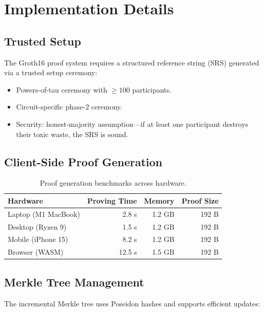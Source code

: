 \section{Implementation Details}
\label{sec:implementation}

\subsection{Trusted Setup}

The Groth16 proof system requires a structured reference string (SRS) generated via a trusted setup ceremony:

\begin{itemize}
    \item Powers-of-tau ceremony with $\geq 100$ participants.
    \item Circuit-specific phase-2 ceremony.
    \item Security: honest-majority assumption---if at least one participant destroys their toxic waste, the SRS is sound.
\end{itemize}

\subsection{Client-Side Proof Generation}

\begin{table}[H]
\centering
\caption{Proof generation benchmarks across hardware.}
\label{tab:proving}
\begin{tabular}{lrrr}
\toprule
\textbf{Hardware} & \textbf{Proving Time} & \textbf{Memory} & \textbf{Proof Size} \\
\midrule
Laptop (M1 MacBook) & 2.8 s & 1.2 GB & 192 B \\
Desktop (Ryzen 9) & 1.5 s & 1.2 GB & 192 B \\
Mobile (iPhone 15) & 8.2 s & 1.2 GB & 192 B \\
Browser (WASM) & 12.5 s & 1.5 GB & 192 B \\
\bottomrule
\end{tabular}
\end{table}

\subsection{Merkle Tree Management}

The incremental Merkle tree uses Poseidon hashes and supports efficient updates:

